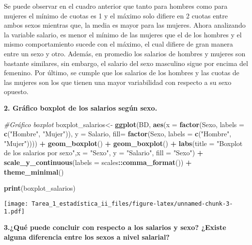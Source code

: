 \documentclass[
]{article}
\newenvironment{Shaded}{\begin{snugshade}}{\end{snugshade}}
\newcommand{\AttributeTok}[1]{\textcolor[rgb]{0.13,0.29,0.53}{#1}}
\newcommand{\CommentTok}[1]{\textcolor[rgb]{0.56,0.35,0.01}{\textit{#1}}}
\newcommand{\FunctionTok}[1]{\textcolor[rgb]{0.13,0.29,0.53}{\textbf{#1}}}
\newcommand{\NormalTok}[1]{#1}
\newcommand{\OtherTok}[1]{\textcolor[rgb]{0.56,0.35,0.01}{#1}}
\newcommand{\SpecialCharTok}[1]{\textcolor[rgb]{0.81,0.36,0.00}{\textbf{#1}}}
\newcommand{\StringTok}[1]{\textcolor[rgb]{0.31,0.60,0.02}{#1}}
\begin{document}
Se puede observar en el cuadro anterior que tanto para hombres como para
mujeres el mínimo de cuotas es 1 y el máximo solo difiere en 2 cuotas
entre ambos sexos mientras que, la media es mayor para las mujeres.
Ahora analizando la variable salario, es menor el mínimo de las mujeres
que el de los hombres y el mismo comportamiento sucede con el máximo, el
cual difiere de gran manera entre un sexo y otro. Además, en promedio
los salarios de hombres y mujeres son bastante similares, sin embargo,
el salario del sexo masculino sigue por encima del femenino. Por último,
se cumple que los salarios de los hombres y las cuotas de las mujeres
son los que tienen una mayor variabilidad con respecto a su sexo
opuesto.

\textbf{2. Gráfico boxplot de los salarios según sexo.}

\begin{Shaded}
\begin{Highlighting}[]
\CommentTok{\#Gráfico boxplot}
\NormalTok{boxplot\_salarios}\OtherTok{\textless{}{-}} \FunctionTok{ggplot}\NormalTok{(BD, }\FunctionTok{aes}\NormalTok{(}\AttributeTok{x =} \FunctionTok{factor}\NormalTok{(Sexo, }\AttributeTok{labels =} \FunctionTok{c}\NormalTok{(}\StringTok{"Hombre"}\NormalTok{, }\StringTok{"Mujer"}\NormalTok{)), }\AttributeTok{y =}\NormalTok{ Salario, }\AttributeTok{fill=} \FunctionTok{factor}\NormalTok{(Sexo, }\AttributeTok{labels =} \FunctionTok{c}\NormalTok{(}\StringTok{"Hombre"}\NormalTok{, }\StringTok{"Mujer"}\NormalTok{)))) }\SpecialCharTok{+} 
  \FunctionTok{geom\_boxplot}\NormalTok{() }\SpecialCharTok{+} \FunctionTok{geom\_boxplot}\NormalTok{() }\SpecialCharTok{+}
  \FunctionTok{labs}\NormalTok{(}\AttributeTok{title =} \StringTok{"Boxplot de los salarios por sexo"}\NormalTok{,}\AttributeTok{x =} \StringTok{"Sexo"}\NormalTok{, }\AttributeTok{y =} \StringTok{"Salario"}\NormalTok{, }
       \AttributeTok{fill =} \StringTok{"Sexo"}\NormalTok{) }\SpecialCharTok{+} 
  \FunctionTok{scale\_y\_continuous}\NormalTok{(}\AttributeTok{labels =}\NormalTok{ scales}\SpecialCharTok{::}\FunctionTok{comma\_format}\NormalTok{()) }\SpecialCharTok{+}
  \FunctionTok{theme\_minimal}\NormalTok{()}

\FunctionTok{print}\NormalTok{(boxplot\_salarios)}
\end{Highlighting}
\end{Shaded}

\texttt{[image: Tarea\_1\_estadística\_ii\_files/figure-latex/unnamed-chunk-3-1.pdf]}

\textbf{3.¿Qué puede concluir con respecto a los salarios y sexo?
¿Existe alguna diferencia entre los sexos a nivel salarial?}
\end{document}
